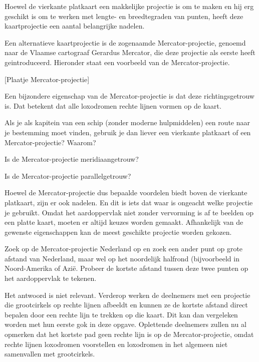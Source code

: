 Hoewel de vierkante platkaart een makkelijke projectie is om te maken en hij erg geschikt is om te werken met lengte- en breedtegraden van punten, heeft deze kaartprojectie een aantal belangrijke nadelen.

Een alternatieve kaartprojectie is de zogenaamde Mercator-projectie, genoemd naar de Vlaamse cartograaf Gerardus Mercator, die deze projectie als eerste heeft geintroduceerd. Hieronder staat een voorbeeld van de Mercator-projectie.

[Plaatje Mercator-projectie]

Een bijzondere eigenschap van de Mercator-projectie is dat deze richtingsgetrouw is. Dat betekent dat alle loxodromen rechte lijnen vormen op de kaart.

\begin{opgave}
	Als je als kapitein van een schip (zonder moderne hulpmiddelen) een route naar je bestemming moet vinden, gebruik je dan liever een vierkante platkaart of een Mercator-projectie? Waarom?
\end{opgave}

\begin{opgave}
	\begin{subopgave}
		Is de Mercator-projectie meridiaangetrouw?
	\end{subopgave}
	\begin{subopgave}
		Is de Mercator-projectie parallelgetrouw?
	\end{subopgave}
\end{opgave}

Hoewel de Mercator-projectie dus bepaalde voordelen biedt boven de vierkante platkaart, zijn er ook nadelen. En dit is iets dat waar is ongeacht welke projectie je gebruikt. Omdat het aardoppervlak niet zonder vervorming is af te beelden op een platte kaart, moeten er altijd keuzes worden gemaakt. Afhankelijk van de gewenste eigenschappen kan de meest geschikte projectie worden gekozen.

\begin{opgave}
	Zoek op de Mercator-projectie Nederland op en zoek een ander punt op grote afstand van Nederland, maar wel op het noordelijk halfrond (bijvoorbeeld in Noord-Amerika of Azi\"e. Probeer de kortste afstand tussen deze twee punten op het aardoppervlak te tekenen.
	\begin{antwoord}
		Het antwoord is niet relevant. Verderop werken de deelnemers met een projectie die grootcirkels op rechte lijnen afbeeldt en kunnen ze de kortste afstand direct bepalen door een rechte lijn te trekken op die kaart. Dit kan dan vergeleken worden met hun eerste gok in deze opgave. Oplettende deelnemers zullen nu al opmerken dat het kortste pad geen rechte lijn is op de Mercator-projectie, omdat rechte lijnen loxodromen voorstellen en loxodromen in het algemeen niet samenvallen met grootcirkels.
	\end{antwoord}
\end{opgave}


